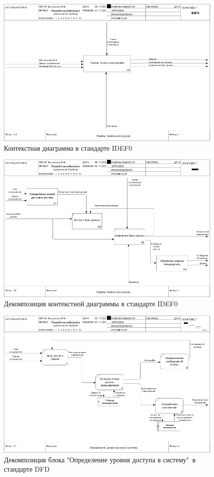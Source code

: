 \documentclass[14pt]{extreport}
\begin{document}
\begin{landscape}
\begin{figure}[H]
\centerline{\includegraphics[width=0.9\linewidth]{dfd01_A-0}}
\caption{Контекстная диаграмма в стандарте IDEF0}
\label{fig14}
\end{figure}

\begin{figure}[H]
\centerline{\includegraphics[width=0.9\linewidth]{dfd02_A0}}
\caption{Декомпозиция контекстной диаграммы в стандарте IDEF0}
\label{fig15}
\end{figure}

\begin{figure}[H]
\centerline{\includegraphics[width=0.9\linewidth]{dfd03_A1}}
\caption{Декомпозиция блока "Определение уровня доступа в систему"\ в стандарте DFD}
\label{fig16}
\end{figure}


\end{landscape}
\end{document}
